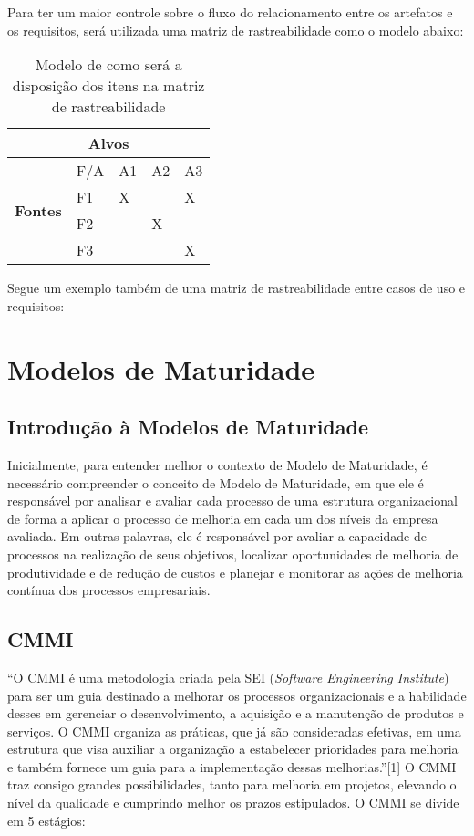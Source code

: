Para ter um maior controle sobre o fluxo do relacionamento entre os artefatos e os requisitos, será utilizada uma matriz de rastreabilidade como o modelo abaixo:

\begin{table}[h]
\centering
\label{itens-traceability}
\begin{tabular}{|l|l|l|l|l|}
\hline
\multicolumn{5}{|c|}{\textbf{Alvos}}                  \\ \hline
\multirow{4}{*}{\textbf{Fontes}} & F/A & A1 & A2 & A3 \\ \cline{2-5} 
                                 & F1  & X  &    & X  \\ \cline{2-5} 
                                 & F2  &    & X  &    \\ \cline{2-5} 
                                 & F3  &    &    & X  \\ \hline
\end{tabular}
\caption{Modelo de como será a disposição dos itens na matriz de rastreabilidade}
\end{table}

Segue um exemplo também de uma matriz de rastreabilidade entre casos de uso e requisitos:

\section{Modelos de Maturidade}

\subsection{Introdução à Modelos de Maturidade}

Inicialmente, para entender melhor o contexto de Modelo de Maturidade, é necessário compreender o conceito de Modelo de Maturidade, em que ele é responsável por analisar e avaliar cada processo de uma estrutura organizacional de forma a aplicar o processo de melhoria em cada um dos níveis da empresa avaliada. Em outras palavras, ele é responsável por avaliar a capacidade de processos na realização de seus objetivos, localizar oportunidades de melhoria de produtividade e de redução de custos e planejar e monitorar as ações de melhoria contínua dos processos empresariais.

\subsection{CMMI}

“O CMMI é uma metodologia criada pela SEI (\textit{Software Engineering Institute}) para ser um guia destinado a melhorar os processos organizacionais e a habilidade desses em gerenciar o desenvolvimento, a aquisição e a manutenção de produtos e serviços. O CMMI organiza as práticas, que já são consideradas efetivas, em uma estrutura que visa auxiliar a organização a estabelecer prioridades para melhoria e também fornece um guia para a implementação dessas melhorias.”[1]
O CMMI traz consigo grandes possibilidades, tanto para melhoria em projetos, elevando o nível da qualidade e cumprindo melhor os prazos estipulados.
O CMMI se divide em 5 estágios:

